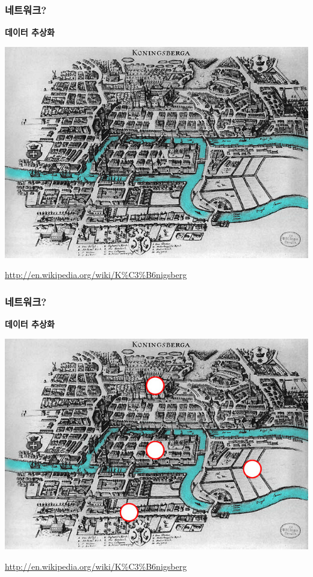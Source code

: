 \documentclass{beamer}
\begin{document}
\begin{frame}
\frametitle{네트워크?}
\textbf{데이터 추상화}\\
\begin{center}
\includegraphics[scale=0.35]{Koenigsberg.jpg}
\end{center}
\hfill
\tiny
\href{http://en.wikipedia.org/wiki/K\%C3\%B6nigsberg}{http://en.wikipedia.org/wiki/K\%C3\%B6nigsberg}
\end{frame}

\begin{frame}
\frametitle{네트워크?}
\textbf{데이터 추상화}\\
\begin{center}
\includegraphics[scale=0.35]{Koenigsberg_node.jpg}
\end{center}
\hfill
\tiny
\href{http://en.wikipedia.org/wiki/K\%C3\%B6nigsberg}{http://en.wikipedia.org/wiki/K\%C3\%B6nigsberg}
\end{frame}
\end{document}
